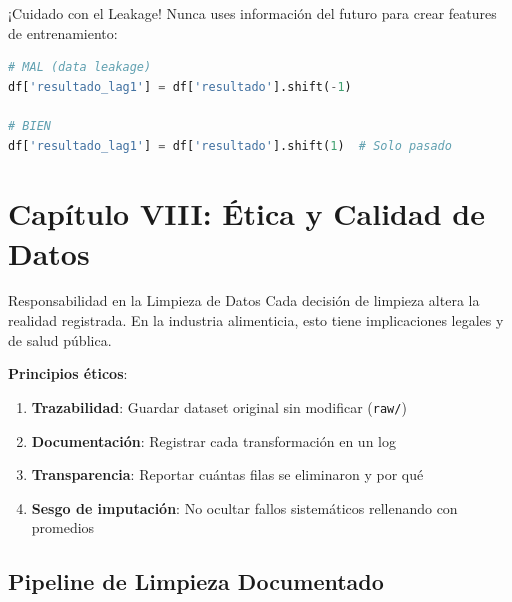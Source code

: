 \documentclass[11pt, a4paper]{article}
\begin{document}
\begin{warningbox}{¡Cuidado con el Leakage!}
Nunca uses información del futuro para crear features de entrenamiento:
\begin{lstlisting}[language=Python]
# MAL (data leakage)
df['resultado_lag1'] = df['resultado'].shift(-1)

# BIEN
df['resultado_lag1'] = df['resultado'].shift(1)  # Solo pasado
\end{lstlisting}
\end{warningbox}

\newpage

\section{Capítulo VIII: Ética y Calidad de Datos}

\begin{ethicsbox}{Responsabilidad en la Limpieza de Datos}
Cada decisión de limpieza altera la realidad registrada. En la industria alimenticia, esto tiene implicaciones legales y de salud pública.

\textbf{Principios éticos}:
\begin{enumerate}
    \item \textbf{Trazabilidad}: Guardar dataset original sin modificar (\texttt{raw/})
    \item \textbf{Documentación}: Registrar cada transformación en un log
    \item \textbf{Transparencia}: Reportar cuántas filas se eliminaron y por qué
    \item \textbf{Sesgo de imputación}: No ocultar fallos sistemáticos rellenando con promedios
\end{enumerate}
\end{ethicsbox}

\subsection{Pipeline de Limpieza Documentado}
\end{document}
